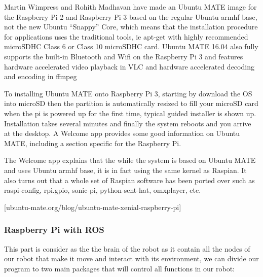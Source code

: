 	Martin Wimpress and Rohith Madhavan have made an Ubuntu MATE image for the Raspberry Pi 2 and Raspberry Pi 3 based on the regular Ubuntu armhf base, not the new Ubuntu “Snappy” Core, which means that the installation procedure for applications uses the traditional tools, ie apt-get with highly recommended microSDHC Class 6 or Class 10 microSDHC card. Ubuntu MATE 16.04 also fully supports the built-in Bluetooth and Wifi on the Raspberry Pi 3 and features hardware accelerated video playback in VLC and hardware accelerated decoding and encoding in ffmpeg
	
	To installing Ubuntu MATE onto Raspberry Pi 3, starting by download the OS into microSD then the partition is automatically resized to fill your microSD card when the pi is powered up for the first time, typical guided installer is shown up. Installation takes several minutes and finally the system reboots and you arrive at the desktop. A Welcome app provides some good information on Ubuntu MATE, including a section specific for the Raspberry Pi.
	
	The Welcome app explains that the while the system is based on Ubuntu MATE and uses Ubuntu armhf base, it is in fact using the same kernel as Raspian. It also turns out that a whole set of Raspian software has been ported over such as raspi-config, rpi.gpio, sonic-pi, python-sent-hat, omxplayer, etc.
	
	[ubuntu-mate.org/blog/ubuntu-mate-xenial-raspberry-pi]
	
	\subsubsection{Raspberry Pi with ROS} 
	
	This part is consider as the the brain of the robot as it contain all the nodes of our robot that make it move and interact with its environment, we can divide our program to two main packages that will control all functions in our robot:
	
